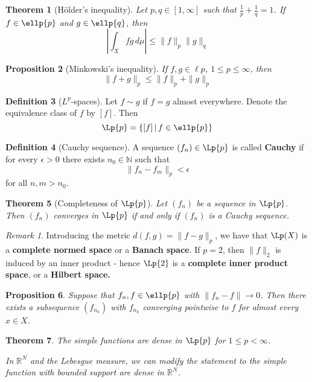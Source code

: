 \documentclass[10pt, oneside, reqno]{amsart}
\theoremstyle{plain}%
\newtheorem{thm}{Theorem}[section]
\newtheorem{prop}[thm]{Proposition}
\theoremstyle{definition}
\newtheorem{defn}[thm]{Definition}
\theoremstyle{remark}
\newtheorem*{rem}{Remark}
\newcommand{\R}{\mathbb{R}}
\newcommand{\dmu}{\, d \mu}
\begin{document}
\begin{thm}[H\"older's inequality]
    Let $p,q \in [1,\infty]$ such that $\frac{1}{p}+\frac{1}{q} = 1$.  If $f \in \ellp{p}$ and $g \in \ellp{q}$, then \[
        | \int_X fg \dmu | \leq \|f\|_p \|g\|_q
    \]
\end{thm}

\begin{prop}[Minkowski's inequality]
    If $f,g \in \ell{p}$, $1\leq p \leq \infty$, then \[
        \|f + g \|_p \leq \|f \|_p + \|g \|_p
    \]
\end{prop}

\begin{defn}[$L^p$-spaces]
    Let $f \sim g$ if $f = g$ almost everywhere.  Denote the equivalence class of $f$ by $[f]$.  Then \[
        \Lp{p} = \{ [f] \, | \, f \in \ellp{p} \} 
    \]
\end{defn}

\begin{defn}[Cauchy sequence]
    A sequence $(f_n) \in \Lp{p}$ is called \textbf{Cauchy} if for every $\epsilon > 0$ there exists $n_0 \in \mathbb{N}$ such that \[
        \| f_n - f_m \|_p < \epsilon
    \] for all $n,m > n_0$.
\end{defn}

\begin{thm}[Completeness of $\Lp{p}$]
    Let $(f_n)$ be a sequence in $\Lp{p}$.  Then $(f_n)$ converges in $\Lp{p}$ if and only if $(f_n)$ is a Cauchy sequence.
\end{thm}

\begin{rem}
    Introducing the metric $d(f,g) = \|f-g\|_p$, we have that $\Lp(X)$ is a \textbf{complete normed space} or a \textbf{Banach space}. If $p = 2$, then $\|f \|_2 $ is induced by an inner product - hence $\Lp{2}$ is a \textbf{complete inner product space}, or a \textbf{Hilbert space.}
\end{rem}


\begin{prop}
    Suppose that $f_n, f \in \ellp{p}$ with $\|f_n - f \| \rightarrow 0$. Then there exists a subsequence $(f_{n_k})$ with $f_{n_k}$ converging pointwise to $f$ for almost every $x \in X$.
\end{prop}


\begin{thm}
    The simple functions are dense in $\Lp{p}$ for $1 \leq p < \infty$.
    
    In $\R^N$ and the Lebesgue measure, we can modify the statement to the simple function with bounded support are dense in $\R^N$. 
\end{thm}
\end{document}
